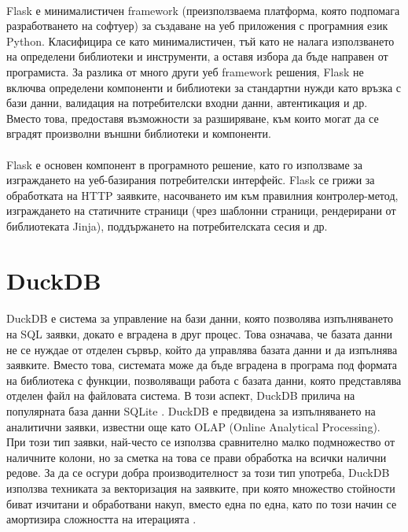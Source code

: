 \documentclass[pdftex,cyrillic,14pt,a4page,twoside]{extreport}
\begin{document}
\paragraph{}
Flask \cite{flask} е минималистичен framework (преизползваема платформа, която подпомага разработването на софтуер) за създаване на уеб приложения с програмния език Python. Класифицира се като минималистичен, тъй като не налага използването на определени библиотеки и инструменти, а оставя избора да бъде направен от програмиста. За разлика от много други уеб framework решения, Flask не включва определени компоненти и библиотеки за стандартни нужди като връзка с бази данни, валидация на потребителски входни данни, автентикация и др. Вместо това, предоставя възможности за разширяване, към които могат да се вградят произволни външни библиотеки и компоненти.

\paragraph{}
Flask е основен компонент в програмното решение, като го използваме за изграждането на уеб-базирания потребителски интерфейс. Flask се грижи за обработката на HTTP заявките, насочването им към правилния контролер-метод, изграждането на статичните страници (чрез шаблонни страници, рендерирани от библиотеката Jinja), поддържането на потребителската сесия и др.
\section{DuckDB}
\paragraph{}
DuckDB \cite{raasveldt2019} е система за управление на бази данни, която позволява изпълняването на SQL заявки, докато е вградена в друг процес. Това означава, че базата данни не се нуждае от отделен сървър, който да управлява базата данни и да изпълнява заявките. Вместо това, системата може да бъде вградена в програма под формата на библиотека с функции, позволяващи работа с базата данни, която представлява отделен файл на файловата система. В този аспект, DuckDB прилича на популярната база данни SQLite \cite{sqlite2020hipp}. DuckDB е предвидена за изпълняването на аналитични заявки, известни още като OLAP (Online Analytical Processing). При този тип заявки, най-често се използва сравнително малко подмножество от наличните колони, но за сметка на това се прави обработка на всички налични редове. За да се осгури добра производителност за този тип употреба, DuckDB използва техниката за векторизация на заявките, при която множество стойности биват изчитани и обработвани накуп, вместо една по една, като по този начин се амортизира сложността на итерацията \cite{kersten2018}.
\end{document}
